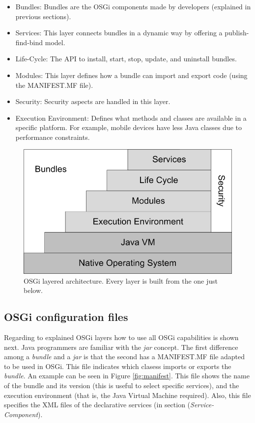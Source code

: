 \documentclass{sig-alternate}
\begin{document}
\begin{itemize}
\item Bundles: Bundles are the OSGi components made by developers (explained in previous sections).
\item Services: This layer connects bundles in a dynamic way by offering a publish-find-bind model.
\item Life-Cycle: The API to install, start, stop, update, and uninstall bundles.
\item Modules: This layer defines how a bundle can import and export code (using the MANIFEST.MF file).
\item Security: Security aspects are handled in this layer.
\item Execution Environment: Defines what methods and classes are available in a specific platform. For example, mobile devices have less Java classes due to performance constraints.
\end{itemize}


\begin{figure}[t] 
\begin{center} 
\includegraphics[scale=0.8]{images/osgi-oficial.eps} 
\end{center} 
\caption{OSGi layered architecture. Every layer is built from the one just below.} 
\label{fig:osgi-original} 
\end{figure}


\subsection{OSGi configuration files}
Regarding to explained OSGi layers how to use all OSGi capabilities is shown next. Java programmers are familiar with the {\em jar} concept. The first difference among a {\em bundle} and a {\em jar} is that the second has a MANIFEST.MF file adapted to be used in OSGi. This file indicates which clasess imports or exports the {\em bundle}. An example can be seen in Figure \ref{fig:manifest}. This file shows the name of the bundle and its version (this is useful to select specific services), and the execution environment (that is, the Java Virtual Machine required). Also, this file specifies the XML files of the declarative services (in section ({\em Service-Component}).
\end{document}
